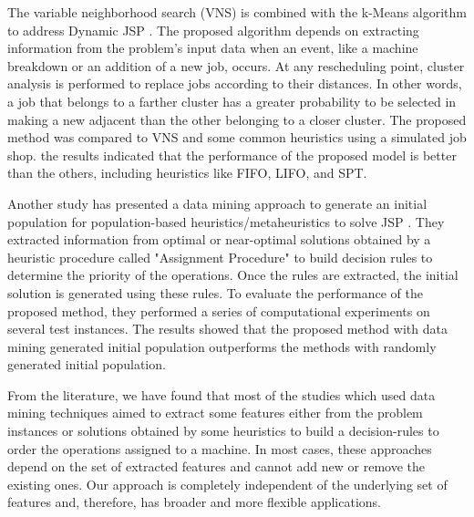 \documentclass[runningheads]{llncs}
\begin{document}
The variable neighborhood search (VNS) is combined with the k-Means algorithm to address Dynamic JSP \cite{adibi2014clustering}. The proposed algorithm depends on extracting information from the problem's input data when an event, like a machine breakdown or an addition of a new job, occurs. At any rescheduling point, cluster analysis is performed to replace jobs according to their distances. In other words, a job that belongs to a farther cluster has a greater probability to be selected in making a new adjacent than the other belonging to a closer cluster. The proposed method was compared to VNS and some common heuristics using a simulated job shop. the results indicated that the performance of the proposed model is better than the others, including heuristics like FIFO, LIFO, and SPT.

Another study has presented a data mining approach to generate an initial population for population-based heuristics/metaheuristics to solve JSP \cite{nasiri2019data}. They extracted information from optimal or near-optimal solutions obtained by a heuristic procedure called "Assignment Procedure" to build decision rules to determine the priority of the operations. Once the rules are extracted, the initial solution is generated using these rules. To evaluate the performance of the proposed method, they performed a series of computational experiments on several test instances. The results showed that the proposed method with data mining generated initial population outperforms the methods with randomly generated initial population.

From the literature, we have found that most of the studies which used data mining techniques aimed to extract some features either from the problem instances or solutions obtained by some heuristics to build a decision-rules to order the operations assigned to a machine. In most cases, these approaches depend on the set of extracted features and cannot add new or remove the existing ones. Our approach is completely independent of the underlying set of features and, therefore, has broader and more flexible applications.
\end{document}

